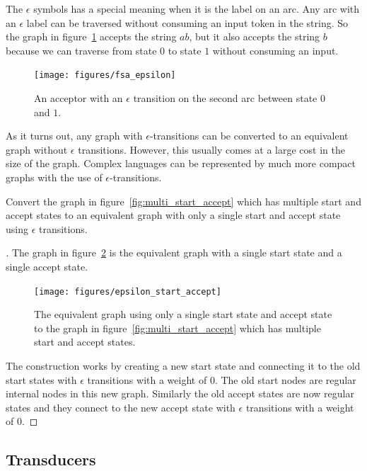 \documentclass[main.tex]{subfiles}
\begin{document}
The $\epsilon$ symbols has a special meaning when it is the label on an arc.
Any arc with an $\epsilon$ label can be traversed without consuming an input
token in the string. So the graph in figure~\ref{fig:fsa_epsilon} accepts the
string $ab$, but it also accepts the string $b$ because we can traverse from
state $0$ to state $1$ without consuming an input.

\begin{figure}
    \centering
    \texttt{[image: figures/fsa\_epsilon]}
    \caption{An acceptor with an $\epsilon$ transition on the second arc
    between state $0$ and $1$.}
    \label{fig:fsa_epsilon}
\end{figure}

As it turns out, any graph with $\epsilon$-transitions can be converted to an
equivalent graph without $\epsilon$ transitions. However, this usually comes at
a large cost in the size of the graph. Complex languages can be represented by
much more compact graphs with the use of $\epsilon$-transitions.

\begin{example}
Convert the graph in figure~\ref{fig:multi_start_accept} which has multiple
start and accept states to an equivalent graph with only a single start and
accept state using $\epsilon$ transitions.
\end{example}

\begin{proof}[\unskip\nopunct]
The graph in figure~\ref{fig:epsilon_start_accept} is the equivalent graph
with a single start state and a single accept state.

\begin{figure}
    \centering
    \texttt{[image: figures/epsilon\_start\_accept]}
    \caption{The equivalent graph using only a single start state and accept
    state to the graph in figure~\ref{fig:multi_start_accept} which has
    multiple start and accept states.}
    \label{fig:epsilon_start_accept}
\end{figure}

The construction works by creating a new start state and connecting it to the
old start states with $\epsilon$ transitions with a weight of $0$. The old
start nodes are regular internal nodes in this new graph. Similarly the old
accept states are now regular states and they connect to the new accept state
with $\epsilon$ transitions with a weight of $0$.
\end{proof}

\subsection{Transducers}
\end{document}

